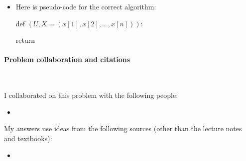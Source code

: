 \begin{itemize}
\item[(e)]

  Here is pseudo-code for the correct algorithm:
  \begin{myframed}
    \begin{steps}
    \ITEM[]
      def \countV$(U, X=(x[1], x[2], \ldots, x[n]))$:
      \begin{blue}
        
        \step \REPLACEME        %

        \step return \REPLACEME
      \end{blue}
    \end{steps}
  \end{myframed}
\end{itemize}

\vfill

\paragraph{Problem  collaboration and citations}~

I collaborated on this problem with the following people:
\begin{blue}
  \begin{itemize}
  \item \REPLACEME                    %
  \end{itemize}
\end{blue}

My answers use ideas from the following sources (other than the lecture notes and textbooks): 
\begin{blue}
  \begin{itemize}
  \item \REPLACEME                    %
  \end{itemize}
\end{blue}




